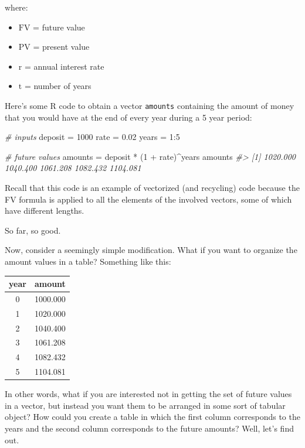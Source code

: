 \documentclass[
]{book}
\newenvironment{Shaded}{\begin{snugshade}}{\end{snugshade}}
\newcommand{\CommentTok}[1]{\textcolor[rgb]{0.56,0.35,0.01}{\textit{#1}}}
\newcommand{\DecValTok}[1]{\textcolor[rgb]{0.00,0.00,0.81}{#1}}
\newcommand{\FloatTok}[1]{\textcolor[rgb]{0.00,0.00,0.81}{#1}}
\newcommand{\NormalTok}[1]{#1}
\newcommand{\OtherTok}[1]{\textcolor[rgb]{0.56,0.35,0.01}{#1}}
\newcommand{\SpecialCharTok}[1]{\textcolor[rgb]{0.00,0.00,0.00}{#1}}
\providecommand{\tightlist}{%
  \setlength{\itemsep}{0pt}\setlength{\parskip}{0pt}}
\begin{document}
where:

\begin{itemize}
\tightlist
\item
  \(\text{FV}\) = future value
\item
  \(\text{PV}\) = present value
\item
  \(\text{r}\) = annual interest rate
\item
  \(\text{t}\) = number of years
\end{itemize}

Here's some R code to obtain a vector \texttt{amounts} containing the amount of money
that you would have at the end of every year during a 5 year period:

\begin{Shaded}
\begin{Highlighting}[]
\CommentTok{\# inputs}
\NormalTok{deposit }\OtherTok{=} \DecValTok{1000}
\NormalTok{rate }\OtherTok{=} \FloatTok{0.02}
\NormalTok{years }\OtherTok{=} \DecValTok{1}\SpecialCharTok{:}\DecValTok{5}

\CommentTok{\# future values}
\NormalTok{amounts }\OtherTok{=}\NormalTok{ deposit }\SpecialCharTok{*}\NormalTok{ (}\DecValTok{1} \SpecialCharTok{+}\NormalTok{ rate)}\SpecialCharTok{\^{}}\NormalTok{years}
\NormalTok{amounts}
\CommentTok{\#\textgreater{} [1] 1020.000 1040.400 1061.208 1082.432 1104.081}
\end{Highlighting}
\end{Shaded}

Recall that this code is an example of vectorized (and recycling) code because
the FV formula is applied to all the elements of the involved vectors, some
of which have different lengths.

So far, so good.

Now, consider a seemingly simple modification. What if you want to organize
the amount values in a table? Something like this:

\begin{longtable}[]{@{}cc@{}}
\toprule
year & amount \\
\midrule
\endhead
0 & 1000.000 \\
1 & 1020.000 \\
2 & 1040.400 \\
3 & 1061.208 \\
4 & 1082.432 \\
5 & 1104.081 \\
\bottomrule
\end{longtable}

In other words, what if you are interested not in getting the set of future
values in a vector, but instead you want them to be arranged in some sort of
tabular object? How could you create a table in which the first column
corresponds to the years and the second column corresponds to the future amounts?
Well, let's find out.
\end{document}
